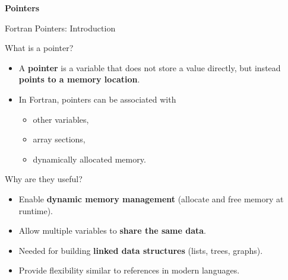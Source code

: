 \begin{frame}
	\centering
	\Huge \textbf{Pointers}
\end{frame}

\begin{frame}{Fortran Pointers: Introduction}
  \begin{block}{What is a pointer?}
    \begin{itemize}
      \item A \textbf{pointer} is a variable that does not store a value directly,
            but instead \textbf{points to a memory location}.
      \item In Fortran, pointers can be associated with
            \begin{itemize}
              \item other variables,
              \item array sections,
              \item dynamically allocated memory.
            \end{itemize}
    \end{itemize}
  \end{block}

  \begin{block}{Why are they useful?}
    \begin{itemize}
      \item Enable \textbf{dynamic memory management}
            (allocate and free memory at runtime).
      \item Allow multiple variables to \textbf{share the same data}.
      \item Needed for building \textbf{linked data structures}
            (lists, trees, graphs).
      \item Provide flexibility similar to references in modern languages.
    \end{itemize}
  \end{block}
\end{frame}


